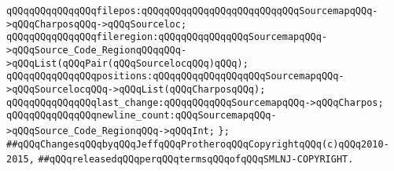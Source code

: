 \newline
\verb|qQQqqQQqqQQqqQQqfilepos:qQQqqQQqqQQqqQQqqQQqqQQqqQQqSourcemapqQQq->qQQqCharposqQQq->qQQqSourceloc;|\newline
\verb|qQQqqQQqqQQqqQQqfileregion:qQQqqQQqqQQqqQQqSourcemapqQQq->qQQqSource_Code_RegionqQQqqQQq->qQQqList(qQQqPair(qQQqSourcelocqQQq)qQQq);|\newline
\verb|qQQqqQQqqQQqqQQqpositions:qQQqqQQqqQQqqQQqqQQqSourcemapqQQq->qQQqSourcelocqQQq->qQQqList(qQQqCharposqQQq);|\newline
\newline
\verb|qQQqqQQqqQQqqQQqlast_change:qQQqqQQqqQQqSourcemapqQQq->qQQqCharpos;|\newline
\verb|qQQqqQQqqQQqqQQqnewline_count:qQQqSourcemapqQQq->qQQqSource_Code_RegionqQQq->qQQqInt;|\newline
\verb|};|\newline
\newline
\newline
\verb|##qQQqChangesqQQqbyqQQqJeffqQQqProtheroqQQqCopyrightqQQq(c)qQQq2010-2015,|\newline
\verb|##qQQqreleasedqQQqperqQQqtermsqQQqofqQQqSMLNJ-COPYRIGHT.|\newline

